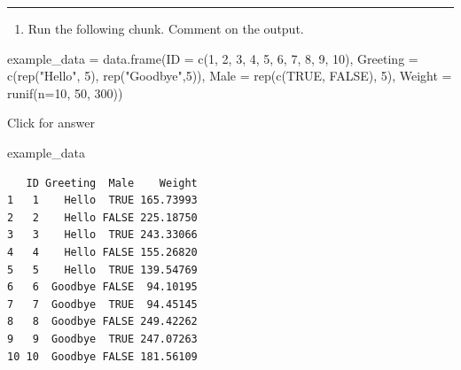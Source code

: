 \documentclass[
]{book}
\newenvironment{Shaded}{\begin{snugshade}}{\end{snugshade}}
\newcommand{\AttributeTok}[1]{\textcolor[rgb]{0.77,0.63,0.00}{#1}}
\newcommand{\ConstantTok}[1]{\textcolor[rgb]{0.00,0.00,0.00}{#1}}
\newcommand{\DecValTok}[1]{\textcolor[rgb]{0.00,0.00,0.81}{#1}}
\newcommand{\FunctionTok}[1]{\textcolor[rgb]{0.00,0.00,0.00}{#1}}
\newcommand{\NormalTok}[1]{#1}
\newcommand{\OtherTok}[1]{\textcolor[rgb]{0.56,0.35,0.01}{#1}}
\newcommand{\StringTok}[1]{\textcolor[rgb]{0.31,0.60,0.02}{#1}}
\providecommand{\tightlist}{%
  \setlength{\itemsep}{0pt}\setlength{\parskip}{0pt}}
\begin{document}
\begin{center}\rule{0.5\linewidth}{0.5pt}\end{center}

\begin{enumerate}
\def\labelenumi{\alph{enumi}.}
\tightlist
\item
  Run the following chunk. Comment on the output.
\end{enumerate}

\begin{Shaded}
\begin{Highlighting}[]
\NormalTok{example\_data }\OtherTok{=} \FunctionTok{data.frame}\NormalTok{(}\AttributeTok{ID =} \FunctionTok{c}\NormalTok{(}\DecValTok{1}\NormalTok{, }\DecValTok{2}\NormalTok{, }\DecValTok{3}\NormalTok{, }\DecValTok{4}\NormalTok{, }\DecValTok{5}\NormalTok{, }\DecValTok{6}\NormalTok{, }\DecValTok{7}\NormalTok{, }\DecValTok{8}\NormalTok{, }\DecValTok{9}\NormalTok{, }\DecValTok{10}\NormalTok{),}
                          \AttributeTok{Greeting =} \FunctionTok{c}\NormalTok{(}\FunctionTok{rep}\NormalTok{(}\StringTok{"Hello"}\NormalTok{, }\DecValTok{5}\NormalTok{), }\FunctionTok{rep}\NormalTok{(}\StringTok{"Goodbye"}\NormalTok{,}\DecValTok{5}\NormalTok{)),}
                          \AttributeTok{Male =} \FunctionTok{rep}\NormalTok{(}\FunctionTok{c}\NormalTok{(}\ConstantTok{TRUE}\NormalTok{, }\ConstantTok{FALSE}\NormalTok{), }\DecValTok{5}\NormalTok{),}
                          \AttributeTok{Weight =} \FunctionTok{runif}\NormalTok{(}\AttributeTok{n=}\DecValTok{10}\NormalTok{, }\DecValTok{50}\NormalTok{, }\DecValTok{300}\NormalTok{))}
\end{Highlighting}
\end{Shaded}

Click for answer

\begin{Shaded}
\begin{Highlighting}[]
\NormalTok{example\_data}
\end{Highlighting}
\end{Shaded}

\begin{verbatim}
   ID Greeting  Male    Weight
1   1    Hello  TRUE 165.73993
2   2    Hello FALSE 225.18750
3   3    Hello  TRUE 243.33066
4   4    Hello FALSE 155.26820
5   5    Hello  TRUE 139.54769
6   6  Goodbye FALSE  94.10195
7   7  Goodbye  TRUE  94.45145
8   8  Goodbye FALSE 249.42262
9   9  Goodbye  TRUE 247.07263
10 10  Goodbye FALSE 181.56109
\end{verbatim}
\end{document}
